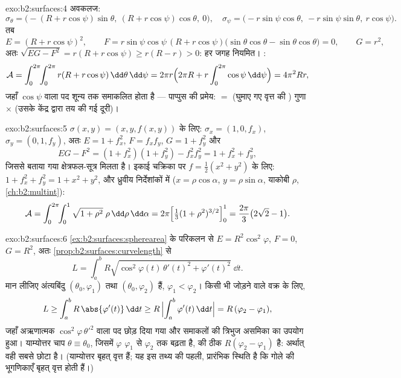\begin{solution}{exo:b2:surfaces:4}
अवकलज:
\[
\sigma_\theta = \bigl(-(R + r\cos\psi)\sin\theta,\
(R + r\cos\psi)\cos\theta,\ 0\bigr),
\quad
\sigma_\psi = \bigl(-r\sin\psi\cos\theta,\
-r\sin\psi\sin\theta,\ r\cos\psi\bigr).
\]
तब
\[
E = (R + r\cos\psi)^2,
\qquad
F = r\sin\psi\cos\psi\,(R + r\cos\psi)
\bigl(\sin\theta\cos\theta - \sin\theta\cos\theta\bigr) = 0,
\qquad
G = r^2 ,
\]
अतः $\sqrt{EG - F^2} = r(R + r\cos\psi) \geq r(R - r) > 0$: हर जगह नियमित। :
\[
\mathcal{A}
= \int_0^{2\pi}\!\!\int_0^{2\pi} r(R + r\cos\psi)
\,\dd\theta\,\dd\psi
= 2\pi r \Bigl(2\pi R + r\int_0^{2\pi}\cos\psi\,\dd\psi\Bigr)
= 4\pi^2 R r ,
\]
जहाँ $\cos\psi$ वाला पद शून्य तक समाकलित होता है --- पाप्पुस की प्रमेय:
 $=$ (घुमाए गए वृत्त की ) गुणा $\times$ (उसके केंद्र
द्वारा तय की गई दूरी)।
\end{solution}

\begin{solution}{exo:b2:surfaces:5}
$\sigma(x, y) = (x, y, f(x,y))$ के लिए: $\sigma_x = (1, 0, f_x)$, $\sigma_y = (0, 1, f_y)$, अतः $E = 1 + f_x^2$, $F = f_xf_y$, $G = 1
+ f_y^2$ और
\[
EG - F^2 = (1 + f_x^2)(1 + f_y^2) - f_x^2f_y^2
= 1 + f_x^2 + f_y^2 ,
\]
जिससे बताया गया क्षेत्रफल-सूत्र मिलता है। इकाई चक्रिका पर $f = \frac12(x^2 + y^2)$ के
लिए: $1 + f_x^2 + f_y^2 = 1 + x^2 + y^2$, और ध्रुवीय निर्देशांकों में ($x = \rho\cos\alpha$, $y = \rho\sin\alpha$, याकोबी
$\rho$, \cref{ch:b2:multint}):
\[
\mathcal{A}
= \int_0^{2\pi}\!\!\int_0^1 \sqrt{1 + \rho^2}\;\rho
\,\dd\rho\,\dd\alpha
= 2\pi\Bigl[\tfrac13(1 + \rho^2)^{3/2}\Bigr]_0^1
= \frac{2\pi}{3}\bigl(2\sqrt2 - 1\bigr).
\]
\end{solution}

\begin{solution}{exo:b2:surfaces:6}
\cref{ex:b2:surfaces:spherearea} के परिकलन से $E =
R^2\cos^2\varphi$, $F = 0$, $G = R^2$, अतः \cref{prop:b2:surfaces:curvelength} से
\[
L = \int_a^b R\sqrt{\cos^2\varphi(t)\,\theta'(t)^2
+ \varphi'(t)^2}\;\dd t .
\]
मान लीजिए अंत्यबिंदु $(\theta_0, \varphi_1)$ तथा $(\theta_0,
\varphi_2)$ हैं, $\varphi_1 < \varphi_2$। किसी भी जोड़ने वाले
वक्र के लिए,
\[
L \geq \int_a^b R\,\abs{\varphi'(t)}\,\dd t
\geq R\,\Bigl|\int_a^b \varphi'(t)\,\dd t\Bigr|
= R\,(\varphi_2 - \varphi_1),
\]
जहाँ अऋणात्मक $\cos^2\varphi\,\theta'^2$ वाला पद छोड़ दिया गया और समाकलों की त्रिभुज
असमिका का उपयोग हुआ। याम्योत्तर चाप $\theta \equiv \theta_0$, जिसमें $\varphi$ $\varphi_1$ से
$\varphi_2$ तक बढ़ता है, की \omterm{def:b2:curves:length}{लंबाई} ठीक $R(\varphi_2 - \varphi_1)$ है: अर्थात् वही सबसे छोटा
है। (याम्योत्तर बृहत् वृत्त हैं; यह इस तथ्य की पहली, प्रारंभिक
स्थिति है कि गोले की भूगणिकाएँ बृहत् वृत्त होती हैं।)
\end{solution}

